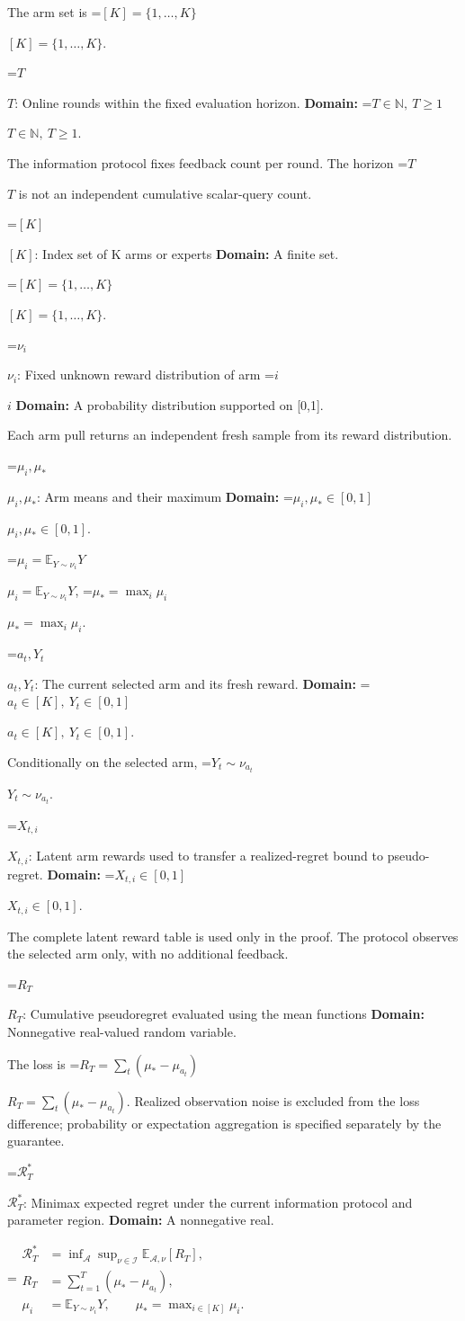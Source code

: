 \documentclass[10pt,a4paper]{article}
\newcommand{\AtlasMath}[1]{\par\begingroup\centering\setbox0=\hbox{$\displaystyle #1$}\ifdim\wd0>1.4\linewidth\typeout{ATLAS WIDE FORMULA: \the\wd0}\fi\ifdim\wd0>\linewidth\resizebox{\linewidth}{!}{\box0}\else\box0\fi\par\endgroup}
\newcommand{\AtlasInlineMath}[1]{\begingroup\setbox0=\hbox{$#1$}\ifdim\wd0>.4\linewidth\endgroup\AtlasMath{#1}\else\endgroup$#1$\fi}
\begin{document}
The arm set is \AtlasInlineMath{[K]=\{1,\ldots,K\}}.

\AtlasInlineMath{T}: Online rounds within the fixed evaluation horizon. \textbf{Domain:} \AtlasInlineMath{T\in\mathbb N,\ T\ge1}.

The information protocol fixes feedback count per round. The horizon \AtlasInlineMath{T} is not an independent cumulative scalar-query count.

\AtlasInlineMath{[K]}: Index set of K arms or experts \textbf{Domain:} A finite set.

\AtlasInlineMath{[K]=\{1,\ldots,K\}}.

\AtlasInlineMath{\nu_i}: Fixed unknown reward distribution of arm \AtlasInlineMath{i} \textbf{Domain:} A probability distribution supported on [0,1].

Each arm pull returns an independent fresh sample from its reward distribution.

\AtlasInlineMath{\mu_i,\mu_*}: Arm means and their maximum \textbf{Domain:} \AtlasInlineMath{\mu_i,\mu_*\in[0,1]}.

\AtlasInlineMath{\mu_i=\mathbb E_{Y\sim\nu_i}Y}, \AtlasInlineMath{\mu_*=\max_i\mu_i}.

\AtlasInlineMath{a_t,Y_t}: The current selected arm and its fresh reward. \textbf{Domain:} \AtlasInlineMath{a_t\in[K],\ Y_t\in[0,1]}.

Conditionally on the selected arm, \AtlasInlineMath{Y_t\sim\nu_{a_t}}.

\AtlasInlineMath{X_{t,i}}: Latent arm rewards used to transfer a realized-regret bound to pseudo-regret. \textbf{Domain:} \AtlasInlineMath{X_{t,i}\in[0,1]}.

The complete latent reward table is used only in the proof. The protocol observes the selected arm only, with no additional feedback.

\AtlasInlineMath{R_T}: Cumulative pseudoregret evaluated using the mean functions \textbf{Domain:} Nonnegative real-valued random variable.

The loss is \AtlasInlineMath{R_T=\sum_t(\mu_*-\mu_{a_t})}. Realized observation noise is excluded from the loss difference; probability or expectation aggregation is specified separately by the guarantee.

\AtlasInlineMath{\mathcal R_T^*}: Minimax expected regret under the current information protocol and parameter region. \textbf{Domain:} A nonnegative real.


\AtlasMath{\begin{aligned}\mathcal R_T^*&=\inf_{\mathcal A}\sup_{\nu\in\mathcal I}\mathbb E_{\mathcal A,\nu}[R_T],\\ R_T&=\sum_{t=1}^T(\mu_*-\mu_{a_t}),\\ \mu_i&=\mathbb E_{Y\sim\nu_i}Y,\qquad\mu_*=\max_{i\in[K]}\mu_i.\end{aligned}}
\end{document}
